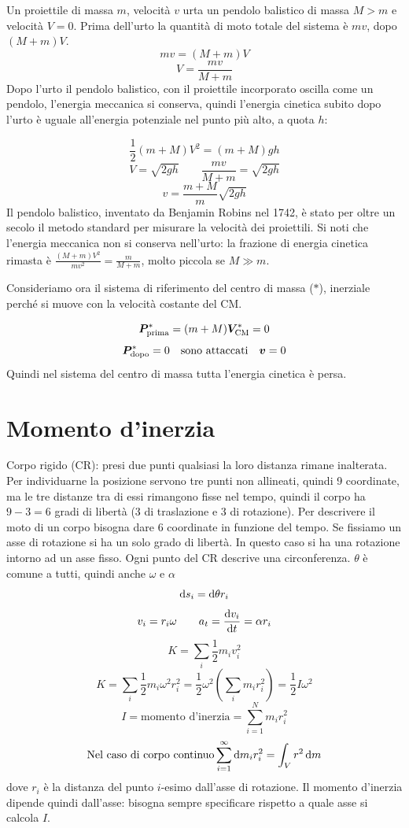 \begin{Es}
  Un proiettile di massa $m$, velocità $v$ urta un pendolo balistico di massa $M>m$ e velocità $V=0$. Prima dell'urto la quantità di moto totale del sistema è $mv$, dopo $(M+m)V$.
  \[mv=(M+m)V\]
  \[V=\frac{mv}{M+m}\]
  Dopo l'urto il pendolo balistico, con il proiettile incorporato oscilla come un pendolo, l'energia meccanica si conserva, quindi l'energia cinetica subito dopo l'urto è uguale all'energia potenziale nel punto più alto, a quota $h$:


  \[\frac{1}{2}(m+M)V^2=(m+M)gh\]
  \[V=\sqrt{2gh}\qquad\frac{mv}{M+m}=\sqrt{2gh}\]
  \[v=\frac{m+M}{m}\sqrt{2gh}\]
  Il pendolo balistico, inventato da Benjamin Robins nel 1742, è stato per oltre un secolo il metodo standard per misurare la velocità dei proiettili. Si noti che l'energia meccanica non si conserva nell'urto: la frazione di energia cinetica rimasta è $\frac{(M+m)V^2}{mv^2}=\frac{m}{M+m}$, molto piccola se $M\gg m$.

  Consideriamo ora il sistema di riferimento del centro di massa ($\ast$), inerziale perché
  si muove con la velocità costante del CM.

  \[\boldsymbol{P}^\ast_{\text{prima}}=(m+M)\boldsymbol{V}_{\text{CM}}^\ast=0\]
  \[\boldsymbol{P}^\ast_{\text{dopo}}=0\quad\text{sono attaccati}\quad \boldsymbol{v}=0\] Quindi nel sistema del centro di massa tutta l'energia cinetica è persa.
\end{Es}
\section{Momento d'inerzia}
Corpo rigido (CR): presi due punti qualsiasi la loro distanza
rimane inalterata. Per individuarne la posizione servono tre punti non allineati, quindi 9 coordinate, ma le
tre distanze tra di essi rimangono fisse nel tempo, quindi il corpo ha $9-3=6$ gradi di
libertà (3 di traslazione e 3 di rotazione). Per descrivere il moto di un corpo bisogna dare 6
coordinate in funzione del tempo. Se fissiamo un asse di rotazione
si ha un solo grado di libertà. In questo caso si ha una rotazione
intorno ad un asse fisso. Ogni punto del CR descrive una
circonferenza. $\theta$ è comune a tutti, quindi anche $\omega$ e
$\alpha$
\[\mathrm{d} s_i=\mathrm{d} \theta r_i\]
\[v_i=r_i\omega \qquad a_t=\frac{\mathrm{d} v_i}{\mathrm{d} t}=\alpha r_i\]
\[K=\sum_i\frac{1}{2}m_iv_i^2\]
\[K=\sum_i\frac{1}{2}m_i\omega^2r_i^2=\frac{1}{2}\omega^2\left(\sum_im_ir_i^2\right)=\frac{1}{2}I\omega^2\]
\[I=\text{momento d'inerzia}=\sum_{i=1}^N m_ir_i^2\]
\[\text{Nel caso di corpo continuo} \sum_{i=1}^\infty \mathrm{d} m_ir_i^2=\int_V  r^2\,\mathrm{d} m\]
dove $r_i$ è la distanza del punto $i$-esimo dall'asse di rotazione. Il momento d'inerzia dipende quindi dall'asse: bisogna sempre specificare rispetto a quale asse si calcola $I$.

